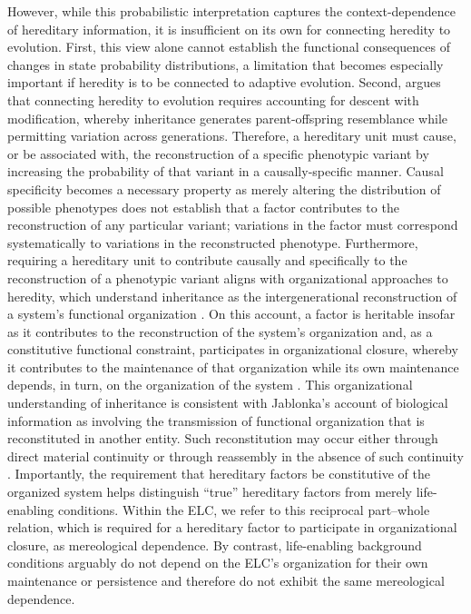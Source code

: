 \documentclass[pdflatex,sn-mathphys-num]{sn-jnl}
\theoremstyle{thmstylethree}
\theoremstyle{thmstyleone}
\begin{document}
However, while this probabilistic interpretation captures the context-dependence of hereditary information, it is insufficient on its own for connecting heredity to evolution. First, this view alone cannot establish the functional consequences of changes in state probability distributions, a limitation that becomes especially important if heredity is to be connected to adaptive evolution. Second, \cite{veigl2022rethinking} argues that connecting heredity to evolution requires accounting for descent with modification, whereby inheritance generates parent-offspring resemblance while permitting variation across generations. Therefore, a hereditary unit must cause, or be associated with, the reconstruction of a specific phenotypic variant by increasing the probability of that variant in a causally-specific manner. Causal specificity becomes a necessary property as merely altering the distribution of possible phenotypes does not establish that a factor contributes to the reconstruction of any particular variant; variations in the factor must correspond systematically to variations in the reconstructed phenotype. Furthermore, requiring a hereditary unit to contribute causally and specifically to the reconstruction of a phenotypic variant aligns with organizational approaches to heredity, which understand inheritance as the intergenerational reconstruction of a system’s functional organization \cite{montevil2015biological}. On this account, a factor is heritable insofar as it contributes to the reconstruction of the system’s organization and, as a constitutive functional constraint, participates in organizational closure, whereby it contributes to the maintenance of that organization while its own maintenance depends, in turn, on the organization of the system \cite{pontarotti2015extended,mossio2022conserving}. This organizational understanding of inheritance is consistent with Jablonka’s \cite{jablonka2002information} account of biological information as involving the transmission of functional organization that is reconstituted in another entity. Such reconstitution may occur either through direct material continuity or through reassembly in the absence of such continuity \cite{veigl2022rethinking}. Importantly, the requirement that hereditary factors be constitutive of the organized system helps distinguish “true” hereditary factors from merely life-enabling conditions. Within the ELC, we refer to this reciprocal part--whole relation, which is required for a hereditary factor to participate in organizational closure, as mereological dependence. By contrast, life-enabling background conditions arguably do not depend on the ELC’s organization for their own maintenance or persistence and therefore do not exhibit the same mereological dependence.
\end{document}
